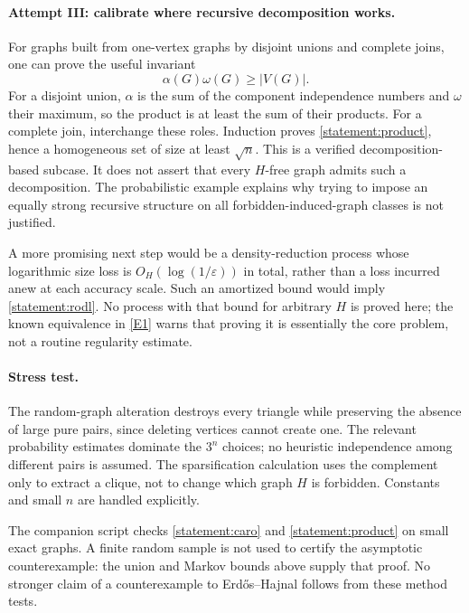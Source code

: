 \documentclass[11pt,a4paper]{article}
\newcommand{\eref}[2]{\hyperlink{extra:#1:#2}{[E#2]}}
\numberwithin{equation}{section}
\begin{document}
\paragraph{Attempt III: calibrate where recursive decomposition works.}
For graphs built from one-vertex graphs by disjoint unions and complete
joins, one can prove the useful invariant
\begin{equation}\label{statement:product}
 \alpha(G)\omega(G)\geq|V(G)|.
\end{equation}
For a disjoint union, $\alpha$ is the sum of the component independence
numbers and $\omega$ their maximum, so the product is at least the
sum of their products.  For a complete join, interchange these roles.
Induction proves \eqref{statement:product}, hence a homogeneous set of size
at least $\sqrt n$.  This is a verified decomposition-based subcase.
It does not assert that every $H$-free graph admits such a decomposition.
The probabilistic example explains why trying to impose an equally
strong recursive structure on all forbidden-induced-graph classes is
not justified.

A more promising next step would be a density-reduction process whose
logarithmic size loss is $O_H(\log(1/\varepsilon))$ in total, rather
than a loss incurred anew at each accuracy scale.  Such an amortized
bound would imply \eqref{statement:rodl}.  No process with that bound for
arbitrary $H$ is proved here; the known equivalence in \eref{statement}{1}
warns that proving it is essentially the core problem, not a routine
regularity estimate.

\paragraph{Stress test.}
The random-graph alteration destroys every triangle while preserving
the absence of large pure pairs, since deleting vertices cannot create
one.  The relevant probability estimates dominate the $3^n$ choices;
no heuristic independence among different pairs is assumed.  The
sparsification calculation uses the complement only to extract a
clique, not to change which graph $H$ is forbidden.  Constants and small
$n$ are handled explicitly.

The companion script checks \eqref{statement:caro} and
\eqref{statement:product} on small exact graphs.  A finite random sample is
not used to certify the asymptotic counterexample: the union and Markov
bounds above supply that proof.  No stronger claim of a counterexample
to Erd\H{o}s--Hajnal follows from these method tests.
\end{document}
